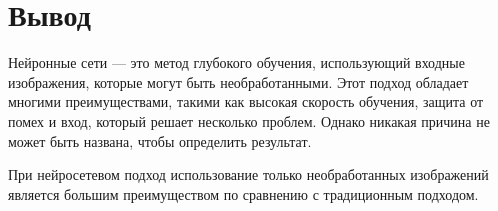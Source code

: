 \section*{Вывод}
Нейронные сети — это метод глубокого обучения, использующий входные изображения, которые могут быть необработанными. Этот подход обладает многими преимуществами, такими как высокая скорость обучения, защита от помех и вход, который решает несколько проблем. Однако никакая причина не может быть названа, чтобы определить результат.

При нейросетевом подход использование только необработанных изображений является большим преимуществом по сравнению с традиционным подходом.